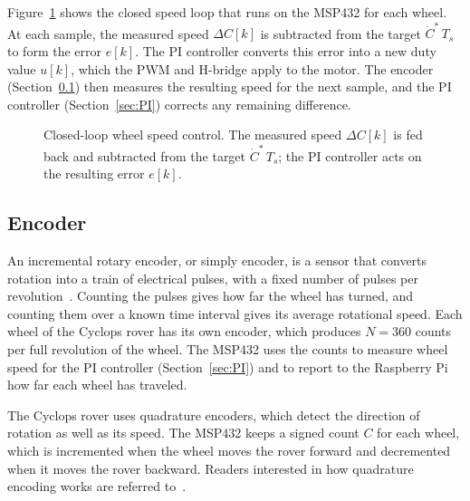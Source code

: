 Figure~\ref{fig:control-loop} shows the closed speed loop that runs on the MSP432 for
each wheel. At each sample, the measured speed $\Delta C[k]$ is subtracted from the target
$\dot{C}^*\,T_s$ to form the error $e[k]$. The PI controller converts this error into a
new duty value $u[k]$, which the PWM and H-bridge apply to the motor. The encoder
(Section~\ref{sec:encoder}) then measures the resulting speed for the next sample, and the
PI controller (Section~\ref{sec:PI}) corrects any remaining difference.

\begin{figure}[htbp]
  \centering
  
  \caption[Closed-loop wheel speed control]{Closed-loop wheel speed control. The
    measured speed $\Delta C[k]$ is fed back and subtracted from the target $\dot{C}^*\,T_s$;
    the PI controller acts on the resulting error $e[k]$.}
  \label{fig:control-loop}
\end{figure}

\subsection{Encoder}
\label{sec:encoder}

An incremental rotary encoder, or simply encoder, is a sensor that converts rotation into
a train of electrical pulses, with a fixed number of pulses per
revolution~\cite{valvano}. Counting the pulses gives how far the wheel has turned, and
counting them over a known time interval gives its average rotational speed. Each wheel of
the Cyclops rover has its own encoder, which produces $N = 360$ counts per full revolution
of the wheel. The MSP432 uses the counts to measure wheel speed for the PI controller
(Section~\ref{sec:PI}) and to report to the Raspberry Pi how far each wheel has traveled.

The Cyclops rover uses quadrature encoders, which detect the direction of rotation as well
as its speed. The MSP432 keeps a signed count $C$ for each wheel, which is incremented
when the wheel moves the rover forward and decremented when it moves the rover backward.
Readers interested in how quadrature encoding works are referred to~\cite{valvano}.

%   

